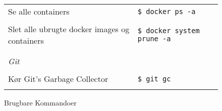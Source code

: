 \begin{figure}[H]
\begin{tabular}{l l}
        \begin{minipage}
            {0.5\textwidth}
            Se alle containers
        \end{minipage}&
        \begin{minipage}
            {0.5\textwidth}
            \texttt{\$ docker ps -a}
        \end{minipage} \\
        & \\
        \begin{minipage}
            {0.5\textwidth}
            Slet alle ubrugte docker images og containers
        \end{minipage}&
        \begin{minipage}
            {0.5\textwidth}
            \texttt{\$ docker system prune -a}
        \end{minipage} \\
        & \\
        \hline
        & \\
        \textit{Git} & \\
        & \\
        \begin{minipage}
            {0.5\textwidth}
            Kør Git's Garbage Collector
        \end{minipage}&
        \begin{minipage}
            {0.5\textwidth}
            \texttt{\$ git gc}
        \end{minipage} \\
        & \\
    \end{tabular}
    \caption{Brugbare Kommandoer}
    \label{fig:brugbare-kommandoer}
\end{figure}
